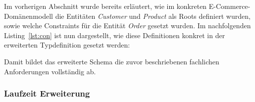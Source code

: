 Im vorherigen Abschnitt wurde bereits erläutert, wie im konkreten E-Commerce-Domänen\-modell die Entitäten \textit{Customer} und \textit{Product} als Roots definiert wurden, sowie welche Constraints für die Entität \textit{Order} gesetzt wurden. Im nachfolgenden Listing~\ref{lst:con} ist nun dargestellt, wie diese Definitionen konkret in der erweiterten Typdefinition gesetzt werden:

\newpage


Damit bildet das erweiterte Schema die zuvor beschriebenen fachlichen Anforderungen vollständig ab.


\subsubsection{Laufzeit Erweiterung}